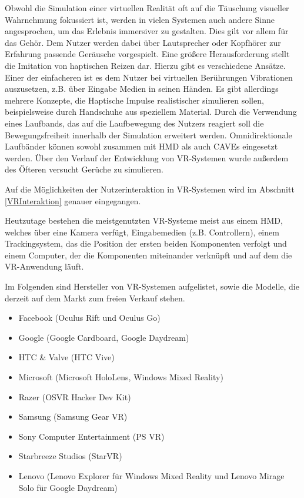 Obwohl die Simulation einer virtuellen Realität oft auf die Täuschung visueller Wahrnehmung fokussiert ist, werden in vielen Systemen auch andere Sinne angesprochen, um das Erlebnis immersiver zu gestalten. Dies gilt vor allem für das Gehör. Dem Nutzer werden dabei über Lautsprecher oder Kopfhörer zur Erfahrung passende Geräusche vorgespielt.
Eine größere Herausforderung stellt die Imitation von haptischen Reizen dar. Hierzu gibt es verschiedene Ansätze. Einer der einfacheren ist es dem Nutzer bei virtuellen Berührungen Vibrationen auszusetzen, z.B. über Eingabe Medien in seinen Händen. Es gibt allerdings mehrere Konzepte, die Haptische Impulse realistischer simulieren sollen, beispielsweise durch Handschuhe aus speziellem Material. %
Durch die Verwendung eines Laufbands, das auf die Laufbewegung des Nutzers reagiert soll die Bewegungsfreiheit innerhalb der Simulation erweitert werden. Omnidirektionale Laufbänder können sowohl zusammen mit HMD als auch CAVEs eingesetzt werden.
Über den Verlauf der Entwicklung von VR-Systemen wurde außerdem des Öfteren versucht Gerüche zu simulieren. %

Auf die Möglichkeiten der Nutzerinteraktion in VR-Systemen wird im Abschnitt \ref{VRInteraktion} genauer eingegangen.

Heutzutage bestehen die meistgenutzten VR-Systeme meist aus einem HMD, welches über eine Kamera verfügt, Eingabemedien (z.B. Controllern), einem Trackingsystem, das die Position der ersten beiden Komponenten verfolgt und einem Computer, der die Komponenten miteinander verknüpft und auf dem die VR-Anwendung läuft. 
  
Im Folgenden sind Hersteller von VR-Systemen aufgelistet, sowie die Modelle, die derzeit auf dem Markt zum freien Verkauf stehen.

\begin{itemize}
\item Facebook (Oculus Rift und Oculus Go)
\item Google (Google Cardboard, Google Daydream)
\item HTC \& Valve (HTC Vive)
\item Microsoft (Microsoft HoloLens, Windows Mixed Reality)
\item Razer (OSVR Hacker Dev Kit)
\item Samsung (Samsung Gear VR)
\item Sony Computer Entertainment (PS VR)
\item Starbreeze Studios (StarVR)
\item Lenovo (Lenovo Explorer für Windows Mixed Reality und Lenovo Mirage Solo für Google Daydream)
\end{itemize}

